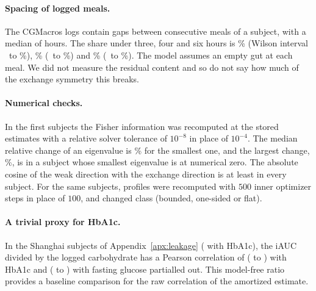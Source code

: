 \paragraph{Spacing of logged meals.}
The CGMacros logs contain \resOverlapGaps{} gaps between consecutive meals of a subject, with a median of
\resOverlapMedianGap{} hours. The share under three, four and six hours is \resOverlapWithinThree\% (Wilson interval
\resOverlapWithinThreeLow\ to \resOverlapWithinThreeHigh\%), \resOverlapWithinFour\% (\resOverlapWithinFourLow\ to
\resOverlapWithinFourHigh\%) and \resOverlapWithinSix\% (\resOverlapWithinSixLow\ to \resOverlapWithinSixHigh\%).
The model assumes an empty gut at each meal. We did not measure the residual content and so do not say how much of
the exchange symmetry this breaks.

\paragraph{Numerical checks.}
In the first \resTolSubjects{} subjects the Fisher information was recomputed at the stored estimates with a
relative solver tolerance of $10^{-8}$ in place of $10^{-4}$. The median relative change of an eigenvalue is
\resTolMedianRel\% for the smallest one, and the largest change, \resTolMaxRel\%, is in a subject whose smallest
eigenvalue is at numerical zero. The absolute cosine of the weak direction with the exchange direction is at least
\resTolMinCos{} in every subject. For the same subjects, \resStepsProfiles{} profiles were recomputed with $500$ inner
optimizer steps in place of $100$, and \resStepsChanged{} changed class (bounded, one-sided or flat).

\paragraph{A trivial proxy for HbA1c.}
In the Shanghai subjects of Appendix~\ref{apx:leakage} (\resProxyN{} with HbA1c), the iAUC divided by the logged
carbohydrate has a Pearson correlation of \resProxyRaw{} (\resProxyRawLow{} to \resProxyRawHigh) with HbA1c and
\resProxyPartial{} (\resProxyPartialLow{} to \resProxyPartialHigh) with fasting glucose partialled out. This model-free ratio provides a baseline comparison for the raw correlation of the amortized estimate.

